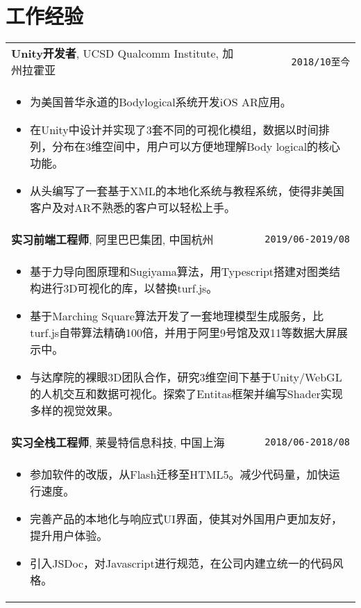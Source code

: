 \documentclass[UTF8]{ctexart}
\newcommand{\itemcols}[1]{
\multicolumn{2}{p{\dimexpr \linewidth-2\tabcolsep}}{
\begin{itemize}
#1
\end{itemize}
}
}
\begin{document}
\section{工作经验}
\smallskip
\noindent
\begin{tabularx}{\textwidth}{X r}
\textbf{\large Unity开发者}, UCSD Qualcomm Institute, 加州拉霍亚 & \texttt{2018/10至今} \\
\itemcols{
\item 为美国普华永道的Bodylogical系统开发iOS AR应用。
\item 在Unity中设计并实现了3套不同的可视化模组，数据以时间排列，分布在3维空间中，用户可以方便地理解Body logical的核心功能。
\item 从头编写了一套基于XML的本地化系统与教程系统，使得非美国客户及对AR不熟悉的客户可以轻松上手。
} \\
\textbf{\large 实习前端工程师}, 阿里巴巴集团, 中国杭州 & \texttt{2019/06-2019/08} \\
\itemcols{
\item 基于力导向图原理和Sugiyama算法，用Typescript搭建对图类结构进行3D可视化的库，以替换turf.js。
\item 基于Marching Square算法开发了一套地理模型生成服务，比turf.js自带算法精确100倍，并用于阿里9号馆及双11等数据大屏展示中。
\item 与达摩院的裸眼3D团队合作，研究3维空间下基于Unity/WebGL的人机交互和数据可视化。探索了Entitas框架并编写Shader实现多样的视觉效果。
} \\
\textbf{\large 实习全栈工程师}, 莱曼特信息科技, 中国上海 & \texttt{2018/06-2018/08} \\
\itemcols{
\item 参加软件的改版，从Flash迁移至HTML5。减少代码量，加快运行速度。
\item 完善产品的本地化与响应式UI界面，使其对外国用户更加友好，提升用户体验。
\item 引入JSDoc，对Javascript进行规范，在公司内建立统一的代码风格。
} \\
\end{tabularx}
\end{document}
